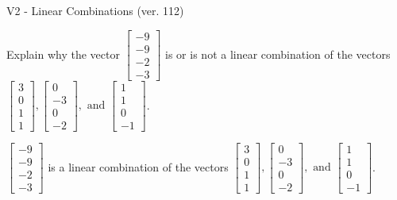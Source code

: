 \begin{exercise}
  \begin{exerciseTitle}V2 - Linear Combinations (ver. 112)\end{exerciseTitle}
  \begin{exerciseStatement}
    Explain why the vector \(\left[\begin{array}{c}
-9 \\
-9 \\
-2 \\
-3
\end{array}\right]\)  is or is not a linear 
	combination of the vectors \(\left[\begin{array}{c}
3 \\
0 \\
1 \\
1
\end{array}\right] , \left[\begin{array}{c}
0 \\
-3 \\
0 \\
-2
\end{array}\right] , \text{ and } \left[\begin{array}{c}
1 \\
1 \\
0 \\
-1
\end{array}\right]\).
	


  \end{exerciseStatement}
  \begin{exerciseAnswer}
   \(\left[\begin{array}{c}
-9 \\
-9 \\
-2 \\
-3
\end{array}\right]\) 
  	 is  
	a linear combination of the vectors \(\left[\begin{array}{c}
3 \\
0 \\
1 \\
1
\end{array}\right] , \left[\begin{array}{c}
0 \\
-3 \\
0 \\
-2
\end{array}\right] , \text{ and } \left[\begin{array}{c}
1 \\
1 \\
0 \\
-1
\end{array}\right]\).

	
  


  \end{exerciseAnswer}
\end{exercise}
